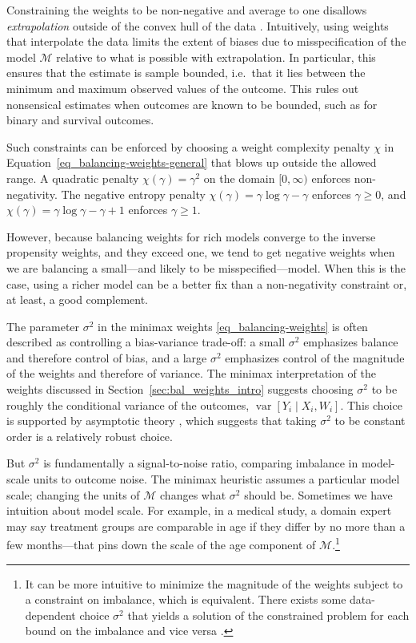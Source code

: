\documentclass{article}
\theoremstyle{definition}
\DeclareMathOperator{\Var}{var}
\newcommand{\dispersion}{\chi}
\newcommand{\model}{\mathcal{M}}
\newcommand{\<}{\langle}
\renewcommand{\>}{\rangle}
\begin{document}
Constraining the weights to be non-negative and average to one disallows \emph{extrapolation} outside of the convex hull of the data \citep{hirshberg2026bregman}. Intuitively, using weights that interpolate the data limits the extent of biases due to misspecification of the model $\mathcal{M}$ relative to what is possible with extrapolation. In particular, this ensures that the estimate is sample bounded, i.e.\ that it lies between the minimum and maximum observed values of the outcome.
This rules out nonsensical estimates when outcomes are known to be bounded, such as for binary and survival outcomes.

Such constraints can be enforced by choosing a weight complexity penalty $\dispersion$ in Equation~\ref{eq_balancing-weights-general} that blows up outside the allowed range. A quadratic penalty $\dispersion(\gamma) = \gamma^2$ on the domain $[0, \infty)$ enforces non-negativity. The negative entropy penalty $\dispersion(\gamma) = \gamma \log \gamma - \gamma$ enforces $\gamma \ge 0$, and $\dispersion(\gamma) = \gamma \log \gamma - \gamma + 1$ enforces $\gamma \ge 1$.

However, because balancing weights for rich models converge to the inverse propensity weights, and they exceed one, we tend to get negative weights when we are balancing a small---and likely to be misspecified---model.
When this is the case, using a richer model can be a better fix than a non-negativity constraint or, at least, a good complement.

The parameter $\sigma^2$ in the minimax weights \eqref{eq_balancing-weights} is often described as controlling a bias-variance trade-off: a small $\sigma^2$ emphasizes balance and therefore control of bias, and a large $\sigma^2$ emphasizes control of the magnitude of the weights and therefore of variance. The minimax interpretation of the weights discussed in Section~\ref{sec:bal_weights_intro} suggests choosing $\sigma^2$ to be roughly the conditional variance of the outcomes, $\Var[Y_i \mid X_i, W_i]$. This choice is supported by asymptotic theory \citep[e.g.,][]{hirshberg2021augmented, hirshberg2019minimax}, which suggests that taking $\sigma^2$ to be constant order is a relatively robust choice.

But $\sigma^2$ is fundamentally a signal-to-noise ratio, comparing imbalance in model-scale units to outcome noise. The minimax heuristic assumes a particular model scale; changing the units of $\model$ changes what $\sigma^2$ should be. Sometimes we have intuition about model scale. For example, in a medical study, a domain expert may say treatment groups are comparable in age if they differ by no more than a few months---that pins down the scale of the age component of $\model$.\footnote{It can be more intuitive to minimize the magnitude of the weights subject to a constraint on imbalance, which is equivalent. There exists some data-dependent choice $\sigma^2$ that yields a solution of the constrained problem for each bound on the imbalance and vice versa \citep[Chapter 5]{boyd2004convex}.}
\end{document}
